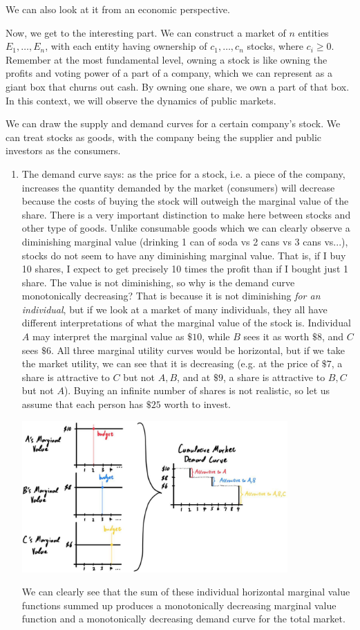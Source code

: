 \documentclass{article}
\begin{document}
    We can also look at it from an economic perspective. 

    Now, we get to the interesting part. We can construct a market of $n$ entities $E_1, \ldots, E_n$, with each entity having ownership of $c_1, \ldots, c_n$ stocks, where $c_i \geq 0$. Remember at the most fundamental level, owning a stock is like owning the profits and voting power of a part of a company, which we can represent as a giant box that churns out cash. By owning one share, we own a part of that box. In this context, we will observe the dynamics of public markets. 

    We can draw the supply and demand curves for a certain company's stock. We can treat stocks as goods, with the company being the supplier and public investors as the consumers. 
    \begin{enumerate}
      \item The demand curve says: as the price for a stock, i.e. a piece of the company, increases the quantity demanded by the market (consumers) will decrease because the costs of buying the stock will outweigh the marginal value of the share. There is a very important distinction to make here between stocks and other type of goods. Unlike consumable goods which we can clearly observe a diminishing marginal value (drinking 1 can of soda vs 2 cans vs 3 cans vs...), stocks do not seem to have any diminishing marginal value. That is, if I buy 10 shares, I expect to get precisely 10 times the profit than if I bought just 1 share. The value is not diminishing, so why is the demand curve monotonically decreasing? That is because it is not diminishing \textit{for an individual}, but if we look at a market of many individuals, they all have different interpretations of what the marginal value of the stock is. Individual $A$ may interpret the marginal value as $\$10$, while $B$ sees it as worth $\$8$, and $C$ sees $\$6$. All three marginal utility curves would be horizontal, but if we take the market utility, we can see that it is decreasing (e.g. at the price of $\$7$, a share is attractive to $C$ but not $A, B$, and at $\$9$, a share is attractive to $B, C$ but not $A$). Buying an infinite number of shares is not realistic, so let us assume that each person has $\$25$ worth to invest. 
      \begin{center}
        \includegraphics[width=0.8\textwidth]{img/Stock_demand_curve.jpg}
      \end{center}
      We can clearly see that the sum of these individual horizontal marginal value functions summed up produces a monotonically decreasing marginal value function and a monotonically decreasing demand curve for the total market. 


\end{enumerate}
\end{document}
